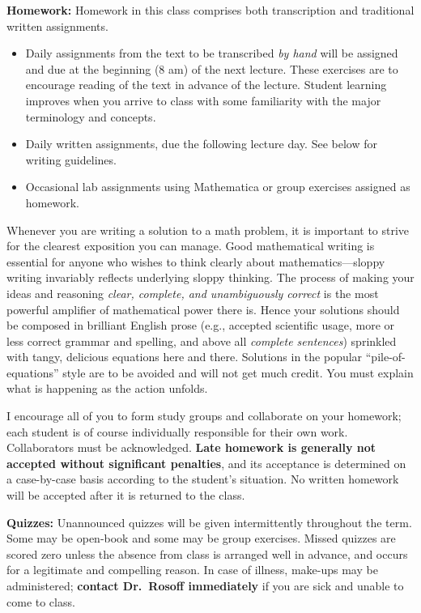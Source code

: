 \documentclass[10pt]{amsart}
\begin{document}
\newpage

\textbf{Homework:} Homework in this class comprises both transcription and traditional written assignments.
\begin{itemize}
    \item Daily assignments from the text to be transcribed \emph{by hand} will be assigned and due at the beginning (8 am) of the next lecture. These exercises are to encourage reading of the text in advance of the lecture. Student learning improves when you arrive to class with some familiarity with the major terminology and concepts.
    \item Daily written assignments, due the following lecture day. See below for writing guidelines.
    \item Occasional lab assignments using Mathematica or group exercises assigned as homework.
\end{itemize}
Whenever you are writing a solution to a math problem, it is important to strive for the clearest exposition you can manage. Good mathematical writing is essential for anyone who wishes to think clearly about mathematics---sloppy writing invariably reflects underlying sloppy thinking. The process of making your ideas and reasoning \emph{clear, complete, and unambiguously correct} is the most powerful amplifier of mathematical power there is. Hence your solutions should be composed in brilliant English prose (e.g., accepted scientific usage, more or less correct grammar and spelling, and above all \emph{complete sentences}) sprinkled with tangy, delicious equations here and there. Solutions in the popular ``pile-of-equations'' style are to be avoided and will not get much credit. You must explain what is happening as the action unfolds.

I encourage all of you to form study groups and collaborate on your homework; each student is of course individually responsible for their own work. Collaborators must be acknowledged. \textbf{Late homework is generally not accepted without significant penalties}, and its acceptance is determined on a case-by-case basis according to the student's situation. No written homework will be accepted after it is returned to the class.

\textbf{Quizzes:} Unannounced quizzes will be given intermittently throughout the term. Some may be open-book and some may be group exercises. Missed quizzes are scored zero unless the absence from class is arranged well in advance, and occurs for a legitimate and compelling reason. In case of illness, make-ups may be administered; \textbf{contact Dr.\ Rosoff immediately} if you are sick and unable to come to class.
\end{document}
